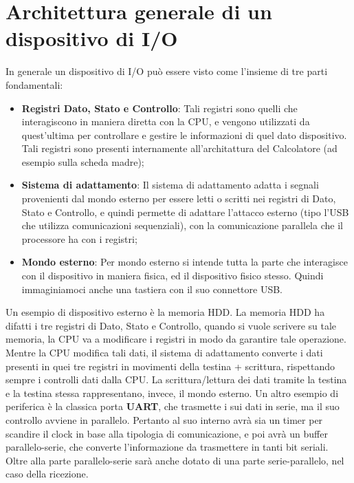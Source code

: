 \section{Architettura generale di un dispositivo di I/O}
In generale un dispositivo di I/O può essere visto come l'insieme di tre parti fondamentali:

\begin{itemize}

    \item \textbf{Registri Dato, Stato e Controllo}: Tali registri sono quelli che interagiscono in maniera diretta con la CPU, e vengono utilizzati da quest'ultima per controllare e gestire le informazioni di quel dato dispositivo. Tali registri sono presenti internamente all'architattura del Calcolatore (ad esempio sulla scheda madre);

    \item \textbf{Sistema di adattamento}: Il sistema di adattamento adatta i segnali provenienti dal mondo esterno per essere letti o scritti nei registri di Dato, Stato e Controllo, e quindi permette di adattare l'attacco esterno (tipo l'USB che utilizza comunicazioni sequenziali), con la comunicazione parallela che il processore ha con i registri;

    \item \textbf{Mondo esterno}: Per mondo esterno si intende tutta la parte che interagisce con il dispositivo in maniera fisica, ed il dispositivo fisico stesso. Quindi immaginiamoci anche una tastiera con il suo connettore USB.

\end{itemize}

Un esempio di dispositivo esterno è la memoria HDD.
La memoria HDD ha difatti i tre registri di Dato, Stato e Controllo, quando si vuole scrivere su tale memoria, la CPU va a modificare i registri in modo da garantire tale operazione. Mentre la CPU modifica tali dati, il sistema di adattamento converte i dati presenti in quei tre registri in movimenti della testina + scrittura, rispettando sempre i controlli dati dalla CPU. La scrittura/lettura dei dati tramite la testina e la testina stessa rappresentano, invece, il mondo esterno.
Un altro esempio di periferica è la classica porta \textbf{UART}, che trasmette i sui dati in serie, ma il suo controllo avviene in parallelo. Pertanto al suo interno avrà sia un timer per scandire il clock in base alla tipologia di comunicazione, e poi avrà un buffer parallelo-serie, che converte l'informazione da trasmettere in tanti bit seriali. Oltre alla parte parallelo-serie sarà anche dotato di una parte serie-parallelo, nel caso della ricezione.


